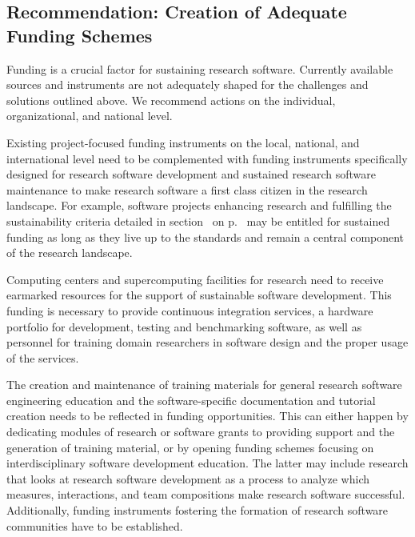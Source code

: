 \documentclass[a4paper,num-refs,numbers,sort&compress]{de-rse}
\begin{document}
\subsection{Recommendation: Creation of Adequate Funding Schemes}

Funding is a crucial factor for sustaining research software. Currently available sources and instruments are not adequately shaped for the challenges and solutions outlined above. We recommend actions on the individual, organizational, and national level.

Existing project-focused funding instruments on the local, national, and international level need to be complemented with funding instruments specifically designed for research software development and sustained research software maintenance to make research software a first class citizen in the research landscape. For example, software projects enhancing research and fulfilling the sustainability criteria detailed in section~ on p.~\pageref{sec:selection} may be entitled for sustained funding as long as they live up to the standards and remain a central component of the research landscape.

Computing centers and supercomputing facilities for research need to receive earmarked resources for the support of sustainable software development. This funding is necessary to provide continuous integration services, a hardware portfolio for development, testing and benchmarking software, as well as personnel for training domain researchers in software design and the proper usage of the services.

The creation and maintenance of training materials for general research software engineering education and the software-specific documentation and tutorial creation needs to be reflected in funding opportunities. This can either happen by dedicating modules of research or software grants to providing support and the generation of training material, or by opening funding schemes focusing on interdisciplinary software development education. The latter may include research that looks at research software development as a process to analyze which measures, interactions, and team compositions make research software successful. Additionally, funding instruments fostering the formation of research software communities have to be established.
\vfill\null 

\end{document}
